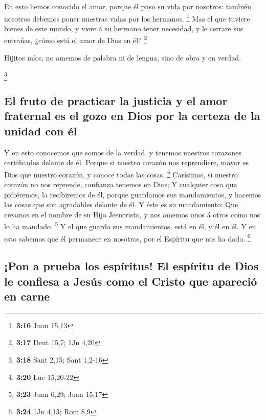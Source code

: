  En esto hemos conocido el amor, porque él puso su vida
por nosotros: también nosotros debemos poner nuestras vidas por los
hermanos. \footnote{\textbf{3:16} Juan 15,13}  Mas el que
tuviere bienes de este mundo, y viere á su hermano tener necesidad, y le
cerrare sus entrañas, ¿cómo está el amor de Dios en él? \footnote{\textbf{3:17}
  Deut 15,7; 1Jn 4,20}

 Hijitos míos, no amemos de palabra ni de lengua, sino de
obra y en verdad.

\footnote{\textbf{3:18} Sant 2,15; Sant 1,2-16}

\hypertarget{el-fruto-de-practicar-la-justicia-y-el-amor-fraternal-es-el-gozo-en-dios-por-la-certeza-de-la-unidad-con-uxe9l}{%
\subsection{El fruto de practicar la justicia y el amor fraternal es el
gozo en Dios por la certeza de la unidad con
él}\label{el-fruto-de-practicar-la-justicia-y-el-amor-fraternal-es-el-gozo-en-dios-por-la-certeza-de-la-unidad-con-uxe9l}}

 Y en esto conocemos que somos de la verdad, y tenemos
nuestros corazones certificados delante de él.  Porque si
nuestro corazón nos reprendiere, mayor es Dios que nuestro corazón, y
conoce todas las cosas. \footnote{\textbf{3:20} Luc 15,20-22}
 Carísimos, si nuestro corazón no nos reprende, confianza
tenemos en Dios;  Y cualquier cosa que pidiéremos, la
recibiremos de él, porque guardamos sus mandamientos, y hacemos las
cosas que son agradables delante de él.  Y éste es su
mandamiento: Que creamos en el nombre de su Hijo Jesucristo, y nos
amemos unos á otros como nos lo ha mandado. \footnote{\textbf{3:23} Juan
  6,29; Juan 15,17}  Y el que guarda sus mandamientos,
está en él, y él en él. Y en esto sabemos que él permanece en nosotros,
por el Espíritu que nos ha dado. \footnote{\textbf{3:24} 1Jn 4,13; Rom
  8,9}

\hypertarget{pon-a-prueba-los-espuxedritus-el-espuxedritu-de-dios-le-confiesa-a-jesuxfas-como-el-cristo-que-apareciuxf3-en-carne}{%
\subsection{¡Pon a prueba los espíritus! El espíritu de Dios le confiesa
a Jesús como el Cristo que apareció en
carne}\label{pon-a-prueba-los-espuxedritus-el-espuxedritu-de-dios-le-confiesa-a-jesuxfas-como-el-cristo-que-apareciuxf3-en-carne}}

